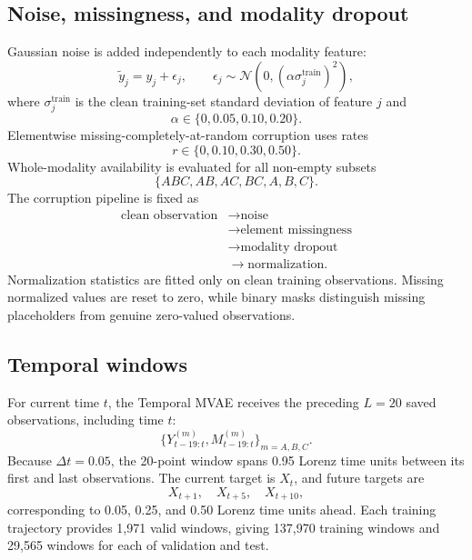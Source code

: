 \documentclass[10pt,twocolumn]{article}
\begin{document}
\subsection{Noise, missingness, and modality dropout}
Gaussian noise is added independently to each modality feature:
\begin{equation}
\widetilde y_j=y_j+\epsilon_j,
\qquad
\epsilon_j\sim\mathcal{N}\!\left(0,(\alpha\sigma_j^{\mathrm{train}})^2\right),
\end{equation}
where $\sigma_j^{\mathrm{train}}$ is the clean training-set standard deviation of feature $j$ and
\begin{equation}
\alpha\in\{0,0.05,0.10,0.20\}.
\end{equation}
Elementwise missing-completely-at-random corruption uses rates
\begin{equation}
r\in\{0,0.10,0.30,0.50\}.
\end{equation}
Whole-modality availability is evaluated for all non-empty subsets
\begin{equation}
\{ABC,AB,AC,BC,A,B,C\}.
\end{equation}
The corruption pipeline is fixed as
\begin{equation}
\begin{aligned}
\text{clean observation} &\rightarrow \text{noise}\\
&\rightarrow \text{element missingness}\\
&\rightarrow \text{modality dropout}\\
&\rightarrow \text{normalization}.
\end{aligned}
\end{equation}
Normalization statistics are fitted only on clean training observations. Missing normalized values are reset to zero, while binary masks distinguish missing placeholders from genuine zero-valued observations.

\subsection{Temporal windows}
For current time $t$, the Temporal MVAE receives the preceding $L=20$ saved observations, including time $t$:
\begin{equation}
\{Y_{t-19:t}^{(m)},M_{t-19:t}^{(m)}\}_{m=A,B,C}.
\end{equation}
Because $\Delta t=0.05$, the 20-point window spans 0.95 Lorenz time units between its first and last observations. The current target is $X_t$, and future targets are
\begin{equation}
X_{t+1},\quad X_{t+5},\quad X_{t+10},
\end{equation}
corresponding to 0.05, 0.25, and 0.50 Lorenz time units ahead. Each training trajectory provides 1,971 valid windows, giving 137,970 training windows and 29,565 windows for each of validation and test.
\end{document}
